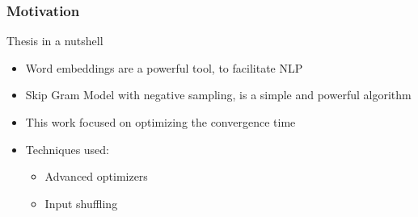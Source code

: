  \begin{frame}
 \frametitle{Motivation} 
 \begin{Large}
 Thesis in a nutshell
 \end{Large}
 \bigskip
 \begin{itemize}
 \item Word embeddings are a powerful tool, to facilitate NLP
 \item Skip Gram Model with negative sampling, is a simple and powerful algorithm
 \item This work focused on optimizing the convergence time
 \item Techniques used: 
 \begin{itemize}
 \item Advanced optimizers
 \item Input shuffling
 \end{itemize}
 \end{itemize}
 \end{frame}
\iffalse
\begin{frame}\frametitle{Motivation}
\textbf{How can we encode vectors for machine learning? }\\
\bigskip 
\centerline{
He =$
\left(
\begin{array}{c}
\rowcolor{green! 20}
1\\
0\\
0\\
\end{array}\right)
$
is = $
\left(
\begin{array}{c}
0\\
\rowcolor{blue! 20}
1\\
0\\
\end{array}\right)
$
King =
$
\left(
\begin{array}{c}
0\\
0\\
\rowcolor{red! 20}
1\\
\end{array}\right)
$}
\bigskip
\begin{itemize}
    \item \texttt{PROBLEMS:}
    \begin{itemize}
    \item All vectors have the same distance to each other
    \item Very high dimension 
    \end{itemize}
\end{itemize}
\end{frame}
\begin{frame}\frametitle {Motivation}
    \framesubtitle{Why are word embeddings necessary?}
    \textbf{We need a new system to create word embeddings }
      \begin{itemize}
 \item $\Rightarrow $Skip-Gram Model  (Mikolov et al. 2013) \cite{mikolov}
 \item Low dimension
 \item Captures meaning
 \item Speeds up and improves other NLP tasks, for example machine translation. 
 \end{itemize}
  \end{frame}
  \fi

